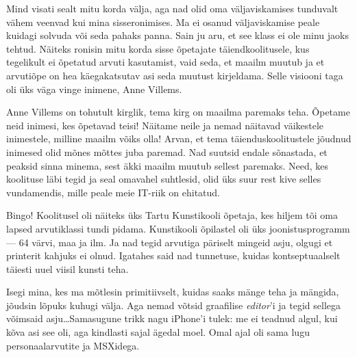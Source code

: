 
Mind visati sealt mitu korda välja, aga nad olid oma väljaviskamises 
tunduvalt vähem veenvad kui mina sisseronimises. Ma ei osanud väljaviskamise peale
kuidagi solvuda või seda pahaks panna. 
Sain ju aru, et see klass ei ole minu jaoks tehtud. Näiteks ronisin 
mitu korda sisse õpetajate täiendkoolitusele, kus tegelikult ei õpetatud 
arvuti kasutamist, vaid seda, et maailm muutub ja et arvutiõpe on 
hea käegakatsutav asi seda muutust kirjeldama. Selle visiooni taga oli üks 
väga vinge inimene, Anne Villems.

Anne Villems on tohutult kirglik, tema kirg on maailma 
paremaks teha. Õpetame neid inimesi, kes õpetavad teisi! Näitame neile ja nemad
näitavad väikestele inimestele, milline maailm võiks olla! 
Arvan, et tema täienduskoolitustele jõudnud inimesed 
olid mõnes mõttes juba paremad. Nad suutsid endale 
sõnastada, et peaksid sinna minema, sest äkki maailm muutub sellest paremaks. Need, 
kes koolituse läbi tegid ja seal omavahel suhtlesid, 
olid üks suur rest kive selles vundamendis, mille peale meie IT-riik on 
ehitatud.


Bingo! Koolitusel oli näiteks
üks Tartu Kunstikooli õpetaja, kes hiljem tõi oma lapsed 
arvutiklassi tundi pidama. Kunstikooli õpilastel oli üks
joonistusprogramm --- 64 värvi, maa ja ilm. Ja nad tegid arvutiga päriselt mingeid asju, olgugi et printerit kahjuks ei olnud. 
Igatahes said nad tunnetuse, kuidas kontseptuaalselt täiesti uuel viisil kunsti teha. 

Isegi mina, kes ma mõtlesin primitiivselt, kuidas saaks mänge teha ja 
mängida, jõudsin lõpuks kuhugi välja. Aga nemad võtsid 
graafilise \emph{editor}'i ja tegid sellega võimsaid
asju\ldots Samasugune trikk nagu iPhone'i tulek: me ei teadnud algul, kui kõva asi see oli, aga kindlasti 
sajal ägedal moel. Omal ajal oli sama lugu personaalarvutite ja MSXidega.


